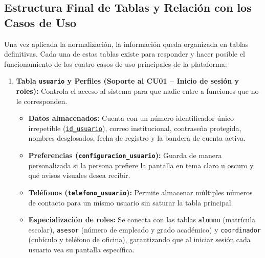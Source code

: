\subsection{Estructura Final de Tablas y Relación con los Casos de Uso}
\label{subsec:tablas_casos_uso}

Una vez aplicada la normalización, la información queda organizada en tablas definitivas. Cada una de estas tablas existe para responder y hacer posible el funcionamiento de los cuatro casos de uso principales de la plataforma:

\begin{enumerate}
    \item \textbf{Tabla \texttt{usuario} y Perfiles (Soporte al CU01 -- Inicio de sesión y roles):} 
    Controla el acceso al sistema para que nadie entre a funciones que no le corresponden.
    \begin{itemize}
        \item \textbf{Datos almacenados:} Cuenta con un número identificador único irrepetible (\underline{\texttt{id\_usuario}}), correo institucional, contraseña protegida, nombres desglosados, fecha de registro y la bandera de cuenta activa.
        \item \textbf{Preferencias (\texttt{configuracion\_usuario}):} Guarda de manera personalizada si la persona prefiere la pantalla en tema claro u oscuro y qué avisos visuales desea recibir.
        \item \textbf{Teléfonos (\texttt{telefono\_usuario}):} Permite almacenar múltiples números de contacto para un mismo usuario sin saturar la tabla principal.
        \item \textbf{Especialización de roles:} Se conecta con las tablas \texttt{alumno} (matrícula escolar), \texttt{asesor} (número de empleado y grado académico) y \texttt{coordinador} (cubículo y teléfono de oficina), garantizando que al iniciar sesión cada usuario vea su pantalla específica.
    \end{itemize}


\end{enumerate}
